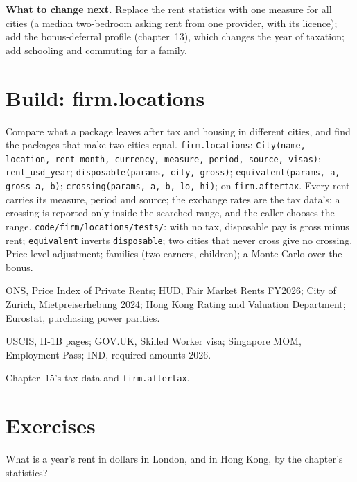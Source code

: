 \textbf{What to change next.} Replace the rent statistics with one measure for all cities (a median two-bedroom asking rent
from one provider, with its licence); add the bonus-deferral profile (chapter~13), which changes the year of taxation;
add schooling and commuting for a family.

\section{Build: firm.locations}\label{bld:in:locations:locations}

\begin{build}
 Compare what a package leaves after tax and housing in different cities, and find the packages that make
two cities equal.
 \texttt{firm.locations}: \texttt{City(name, location, rent\_month, currency, measure, period, source,
visas)}; \texttt{rent\_usd\_year}; \texttt{disposable(params, city, gross)}; \texttt{equivalent(params, a, gross\_a, b)};
\texttt{crossing(params, a, b, lo, hi)}; on \texttt{firm.aftertax}.
 Every rent carries its measure, period and source; the exchange rates are the tax data's; a crossing is
reported only inside the searched range, and the caller chooses the range.
 \texttt{code/firm/locations/tests/}: with no tax, disposable pay is gross minus rent;
\texttt{equivalent} inverts \texttt{disposable}; two cities that never cross give no crossing.
 Price level adjustment; families (two earners, children); a Monte Carlo over the bonus.
\end{build}

\begin{omsources}
\item ONS, Price Index of Private Rents; HUD, Fair Market Rents FY2026; City of Zurich, Mietpreiserhebung 2024; Hong Kong
Rating and Valuation Department; Eurostat, purchasing power parities.
\item USCIS, H-1B pages; GOV.UK, Skilled Worker visa; Singapore MOM, Employment Pass; IND, required amounts 2026.
\item Chapter~15's tax data and \texttt{firm.aftertax}.
\end{omsources}

\section{Exercises}

\begin{exercise}[$\star$]\label{exo:in:locations:1}
What is a year's rent in dollars in London, and in Hong Kong, by the chapter's statistics?
\end{exercise}

